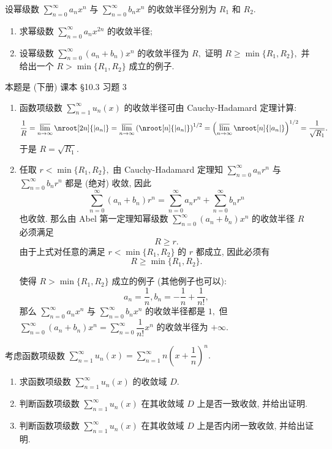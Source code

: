 \begin{question}[points = 10]
设幂级数 $\sum\limits_{n=0}^\infty a_n x^n$ 与 $\sum\limits_{n=0}^\infty b_n x^n$ 的收敛半径分别为 $R_1$ 和 $R_2.$
\begin{enumerate}
\item 求幂级数 $\sum\limits_{n=0}^\infty a_n x^{2n}$ 的收敛半径;
\item 设幂级数 $\sum\limits_{n=0}^\infty (a_n + b_n) x^n$ 的收敛半径为 $R,$ 证明 $R \geqslant \min\{R_1, R_2\},$ 并给出一个 $R > \min\{R_1, R_2\}$ 成立的例子.
\end{enumerate}

\end{question}

\begin{solution}
本题是 (下册) 课本 \S 10.3 习题 3

\begin{enumerate}
\item 函数项级数 $\sum\limits_{n=1}^{\infty} u_n(x)$ 的收敛半径可由 Cauchy-Hadamard 定理计算:
$$\dfrac{1}{R} = \varlimsup_{n\to\infty} \nroot[2n]{\lvert a_{n} \rvert} = \varlimsup_{n\to\infty} \left( \nroot[n]{\lvert a_{n} \rvert} \right)^{1/2} = \left( \varlimsup_{n\to\infty} \nroot[n]{\lvert a_{n} \rvert} \right)^{1/2} = \dfrac{1}{\sqrt{R_1}}.$$
于是 $R = \sqrt{R_1}.$
\item 任取 $r < \min\{R_1, R_2\},$ 由 Cauchy-Hadamard 定理知 $\sum\limits_{n=0}^\infty a_n r^n$ 与 $\sum\limits_{n=0}^\infty b_n r^n$ 都是 (绝对) 收敛, 因此
$$\sum\limits_{n=0}^\infty (a_n + b_n) r^n = \sum\limits_{n=0}^\infty a_n r^n + \sum\limits_{n=0}^\infty b_n r^n$$
也收敛. 那么由 Abel 第一定理知幂级数 $\sum\limits_{n=0}^\infty (a_n + b_n) x^n$ 的收敛半径 $R$ 必须满足
$$R \geqslant r.$$
由于上式对任意的满足 $r < \min\{R_1, R_2\}$ 的 $r$ 都成立, 因此必须有 $$R \geqslant \min\{R_1, R_2\}.$$

使得 $R > \min\{R_1, R_2\}$ 成立的例子 (其他例子也可以):
$$a_n = \dfrac{1}{n}, b_n = -\dfrac{1}{n} + \dfrac{1}{n!},$$
那么 $\sum\limits_{n=0}^\infty a_n x^n$ 与 $\sum\limits_{n=0}^\infty b_n x^n$ 的收敛半径都是 $1,$ 但 $\sum\limits_{n=0}^\infty (a_n + b_n) x^n = \sum\limits_{n=0}^\infty \dfrac{1}{n!} x^n$ 的收敛半径为 $+\infty.$
\end{enumerate}
\end{solution}

\begin{question}[points = 10]
考虑函数项级数 $\sum\limits_{n=1}^{\infty} u_n(x) = \sum\limits_{n=1}^{\infty} n \left( x + \dfrac{1}{n} \right)^n.$
\begin{enumerate}
\item 求函数项级数 $\sum\limits_{n=1}^{\infty} u_n(x)$ 的收敛域 $D.$
\item 判断函数项级数 $\sum\limits_{n=1}^{\infty} u_n(x)$ 在其收敛域 $D$ 上是否一致收敛, 并给出证明.
\item 判断函数项级数 $\sum\limits_{n=1}^{\infty} u_n(x)$ 在其收敛域 $D$ 上是否内闭一致收敛, 并给出证明.
\end{enumerate}

\end{question}

